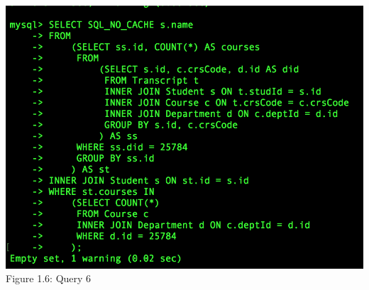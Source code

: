 \documentclass[11pt]{report}
\begin{document}
\begin{center}
			\includegraphics[scale=0.55]{b6.PNG}\\
			Figure 1.6: Query 6\\
		\end{center}
\end{document}

